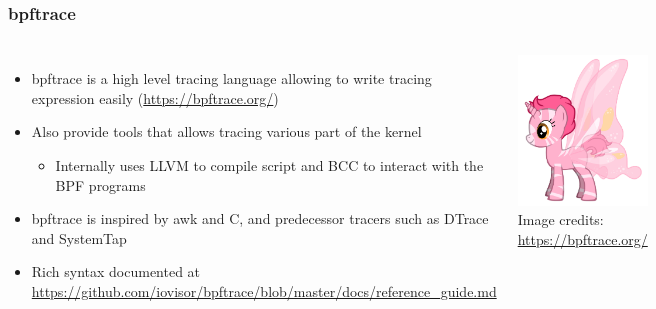 \begin{frame}[fragile]
  \frametitle{bpftrace}
    \begin{columns}
      \begin{itemize}
        \item bpftrace is a high level tracing language allowing to write tracing
              expression easily (\url{https://bpftrace.org/})
        \item Also provide tools that allows tracing various part of the kernel
        \begin{itemize}
          \item Internally uses LLVM to compile script and BCC to interact with the BPF programs
        \end{itemize}
        \item bpftrace is inspired by awk and C, and predecessor tracers such as DTrace and SystemTap
        \item Rich syntax documented at \url{https://github.com/iovisor/bpftrace/blob/master/docs/reference_guide.md}
      \end{itemize}
    \vspace{0.5cm}
    \includegraphics[height=0.2\textheight]{slides/debugging-system-wide-profiling/bpftrace.png}\\ 
    \tiny Image credits: \url{https://bpftrace.org/}
  \end{columns}
\end{frame}


